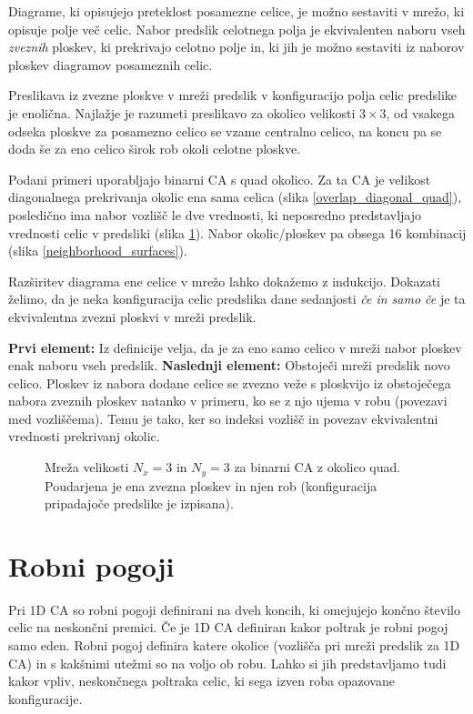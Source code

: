 \documentclass[12pt,a4paper,openany,twoside]{book}
\begin{document}
Diagrame, ki opisujejo preteklost posamezne celice, je možno sestaviti v mrežo,
ki opisuje polje več celic. Nabor predslik celotnega polja je ekvivalenten naboru
vseh \textit{zveznih} ploskev, ki prekrivajo celotno polje in, ki jih je možno sestaviti iz
naborov ploskev diagramov posameznih celic.

Preslikava iz zvezne ploskve v mreži predslik v konfiguracijo polja celic predslike je enolična.
Najlažje je razumeti preslikavo za okolico velikosti \(3 \times 3\),
od vsakega odseka ploskve za posamezno celico se vzame centralno celico,
na koncu pa se doda še za eno celico širok rob okoli celotne ploskve.

Podani primeri uporabljajo binarni CA s quad okolico.
Za ta CA je velikost diagonalnega prekrivanja okolic ena sama celica (slika \ref{overlap_diagonal_quad}),
posledično ima nabor vozlišč le dve vrednosti, ki neposredno predstavljajo
vrednosti celic v predsliki (slika \ref{network_array}).
Nabor okolic/ploskev pa obsega 16 kombinacij (slika \ref{neighborhood_surfaces}).

Razširitev diagrama ene celice v mrežo lahko dokažemo z indukcijo.
Dokazati želimo, da je neka konfiguracija celic predslika dane sedanjosti
\textit{če in samo če} je ta ekvivalentna zvezni ploskvi v mreži predslik.

\textbf{Prvi element:}
Iz definicije velja, da je za eno samo celico v mreži nabor ploskev enak naboru vseh predslik.
\textbf{Naslednji element:}
Obstoječi mreži predslik novo celico.
Ploskev iz nabora dodane celice se zvezno veže s ploskvijo
iz obstoječega nabora zveznih ploskev natanko v primeru,
ko se z njo ujema v robu (povezavi med vozliščema).
Temu je tako, ker so indeksi vozlišč in povezav ekvivalentni vrednosti prekrivanj okolic.

\begin{figure}[htb]
\centerline{}
\caption[Mreža polja celic.]{Mreža velikosti \(N_x=3\) in \(N_y=3\) za binarni CA z okolico quad.
Poudarjena je ena zvezna ploskev in njen rob (konfiguracija pripadajoče predslike je izpisana).}
\label{network_array}
\end{figure}

\section{Robni pogoji} 

Pri 1D CA so robni pogoji definirani na dveh koncih,
ki omejujejo končno število celic na neskončni premici.
Če je 1D CA definiran kakor poltrak je robni pogoj samo eden.
Robni pogoj definira katere okolice (vozlišča pri mreži predslik za 1D CA)
in s kakšnimi utežmi so na voljo ob robu.
Lahko si jih predstavljamo tudi kakor vpliv, neskončnega poltraka celic,
ki sega izven roba opazovane konfiguracije.
\end{document}
